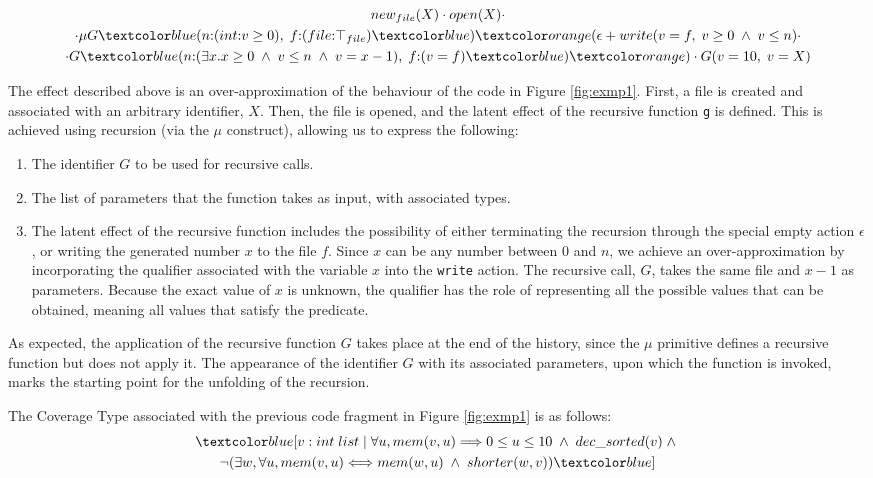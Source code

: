 \begin{equation}
    \begin{gathered}
        new_{file}(X) \cdot open(X) \cdot \\
        \cdot \mu G\bluet{(}n{:}(int{:}v \geq 0), \;f{:}(file{:}\top_{file})\bluet{)}\oranget{(}\epsilon + write(v = f, \; v \geq 0 \;\land\; v \leq n) \cdot \\
        \cdot G\bluet{(}n{:}(\exists x. x \geq 0 \;\land\; v \leq n \;\land\; v = x - 1), \;f{:}(v = f)\bluet{)}\oranget{)} \cdot G(v = 10, \;v = X)
    \end{gathered}
\end{equation}

The effect described above is an over-approximation of the behaviour of the code in Figure 
\ref{fig:exmp1}. First, a file is created and associated with an arbitrary identifier, $X$. Then, the file is opened, and the latent effect of the recursive function \verb|g| is defined. This is achieved using recursion (via the $\mu$ construct), allowing us to express the following:

\begin{enumerate}
    \item The identifier $G$ to be used for recursive calls.
    \item The list of parameters that the function takes as input, with associated types.
    \item The latent effect of the recursive function includes the possibility of either terminating the recursion through the special empty action $\epsilon$, or writing the generated number $x$ to the file $f$. Since $x$ can be any number between $0$ and $n$, we achieve an over-approximation by incorporating the qualifier associated with the variable $x$ into the \verb|write| action. The recursive call, $G$, takes the same file and $x - 1$ as parameters. Because the exact value of $x$ is unknown, the qualifier has the role of representing all the possible values that can be obtained, meaning all values that satisfy the predicate.
\end{enumerate}

As expected, the application of the recursive function $G$ takes place at the end of the history, since the $\mu$ primitive defines a recursive function but does not apply it. The appearance of the identifier $G$ with its associated parameters, upon which the function is invoked, marks the starting point for the unfolding of the recursion.

The Coverage Type associated with the previous code fragment in Figure \ref{fig:exmp1} is as follows:
\begin{equation}
    \begin{gathered}
        \under{v: int\;list \;|\; \forall u, mem(v, u) \Longrightarrow 0 \leq u \leq 10 \;\land\; dec\_sorted(v) \;\land\; \\
        \neg(\exists w, \forall u, mem(v, u) \Longleftrightarrow mem(w, u) \;\land\; shorter(w, v))}
    \end{gathered}
\end{equation}

